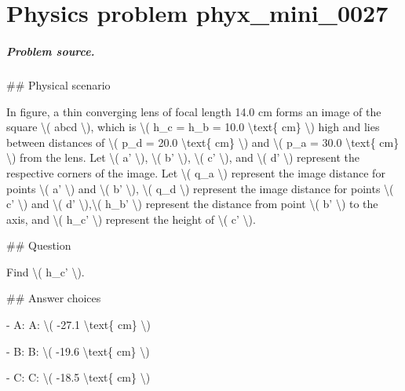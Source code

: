 
\chapter{Physics problem phyx\_mini\_0027}
\label{ch:PhyXMiniProblems_problem_phyx_mini_0027}

\paragraph{Problem source.}
\#\# Physical scenario

In figure, a thin converging lens of focal length 14.0 cm forms an image of the square \textbackslash{}( abcd \textbackslash{}), which is \textbackslash{}( h\_c = h\_b = 10.0 \textbackslash{}text\{ cm\} \textbackslash{}) high and lies between distances of \textbackslash{}( p\_d = 20.0 \textbackslash{}text\{ cm\} \textbackslash{}) and \textbackslash{}( p\_a = 30.0 \textbackslash{}text\{ cm\} \textbackslash{}) from the lens. Let \textbackslash{}( a' \textbackslash{}), \textbackslash{}( b' \textbackslash{}), \textbackslash{}( c' \textbackslash{}), and \textbackslash{}( d' \textbackslash{}) represent the respective corners of the image. Let \textbackslash{}( q\_a \textbackslash{}) represent the image distance for points \textbackslash{}( a' \textbackslash{}) and \textbackslash{}( b' \textbackslash{}), \textbackslash{}( q\_d \textbackslash{}) represent the image distance for points \textbackslash{}( c' \textbackslash{}) and \textbackslash{}( d' \textbackslash{}),\textbackslash{}( h\_b' \textbackslash{}) represent the distance from point \textbackslash{}( b' \textbackslash{}) to the axis, and \textbackslash{}( h\_c' \textbackslash{}) represent the height of \textbackslash{}( c' \textbackslash{}).

\#\# Question

Find \textbackslash{}( h\_c' \textbackslash{}).

\#\# Answer choices

- A: A: \textbackslash{}( -27.1 \textbackslash{}text\{ cm\} \textbackslash{})

- B: B: \textbackslash{}( -19.6 \textbackslash{}text\{ cm\} \textbackslash{})

- C: C: \textbackslash{}( -18.5 \textbackslash{}text\{ cm\} \textbackslash{})

